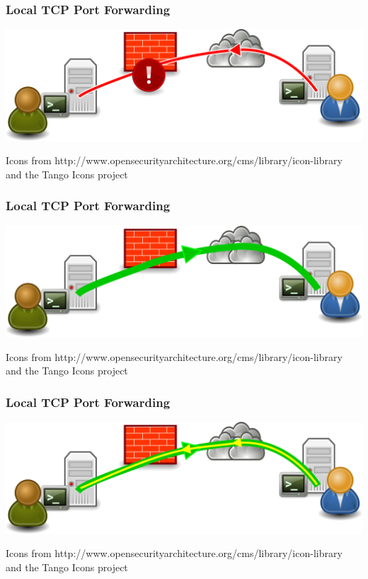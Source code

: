 \begin{frame}
    \frametitle{Local TCP Port Forwarding}
\begin{center}
    \includegraphics[height=.34\paperheight]{drawing-1.png}
\end{center}
\begin{flushright}
    \tiny\color{white}Icons from http://www.opensecurityarchitecture.org/cms/library/icon-library\\and the Tango Icons project
\end{flushright}
\end{frame}
\begin{frame}
    \frametitle{Local TCP Port Forwarding}
\begin{center}
    \includegraphics[height=.34\paperheight]{drawing-2.png}
\end{center}
\begin{flushright}
    \tiny\color{white}Icons from http://www.opensecurityarchitecture.org/cms/library/icon-library\\and the Tango Icons project
\end{flushright}
\end{frame}
\begin{frame}
    \frametitle{Local TCP Port Forwarding}
\begin{center}
    \includegraphics[height=.34\paperheight]{drawing-3.png}
\end{center}
\begin{flushright}
    \tiny\color{white}Icons from http://www.opensecurityarchitecture.org/cms/library/icon-library\\and the Tango Icons project
\end{flushright}
\end{frame}

